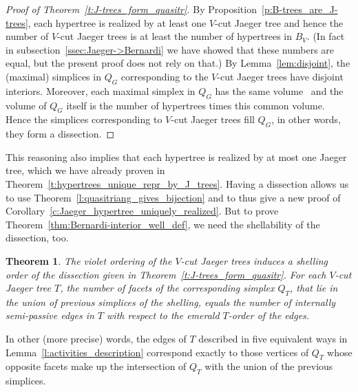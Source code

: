 \documentclass[10pt]{amsart}
\newtheorem{theo}{Theorem}[section]
\theoremstyle{definition}\newtheorem{defi}[theo]{Definition}
\theoremstyle{remark}\newtheorem{rema}[theo]{Remark}
\begin{document}
\begin{proof}[Proof of Theorem~\ref{t:J-trees_form_quasitr}]
 By Proposition~\ref{p:B-trees_are_J-trees}, each hypertree is realized by at least one $V$-cut Jaeger tree and hence the number of $V$-cut Jaeger trees is at least the number of hypertrees in $B_V$. (In fact in subsection~\ref{ssec:Jaeger->Bernardi} we have showed that these numbers are equal, but the present proof does not rely on that.) By Lemma~\ref{lem:disjoint}, the (maximal) simplices in $Q_G$ corresponding to the $V$-cut Jaeger trees have disjoint interiors. Moreover, each maximal simplex in $Q_G$ has the same volume~\cite[Section~12]{alex} and the volume of $Q_G$ itself is the number of hypertrees times this common volume. Hence the simplices corresponding to $V$-cut Jaeger trees fill $Q_G$, in other words, they form a dissection. 
\end{proof}

This reasoning also implies that each hypertree is realized by at most one Jaeger tree, which we have already proven in Theorem~\ref{t:hypertrees_unique_repr_by_J_trees}. Having a dissection allows us to use Theorem~\ref{l:quasitriang_gives_bijection} and to thus give a new proof of Corollary~\ref{c:Jaeger_hypertree_uniquely_realized}. But to prove Theorem~\ref{thm:Bernardi-interior_well_def}, we need the shellability of the dissection, too.

\begin{theo}\label{thm:shelling}
The violet ordering of the $V$-cut Jaeger trees induces a shelling order of the dissection given in Theorem~\ref{t:J-trees_form_quasitr}. For each $V$-cut Jaeger tree $T$, the number of facets of the corresponding simplex $Q_{T}$, that lie in the union of previous simplices of the shelling, equals the number of internally semi-passive edges in $T$ with respect to the emerald $T$-order of the edges.
\end{theo}

In other (more precise) words, the edges of $T$ described in five equivalent ways in Lemma~\ref{l:activities_description} correspond exactly to those vertices of $Q_T$ whose opposite facets make up the intersection of $Q_T$ with the union of the previous simplices.
\end{document}
